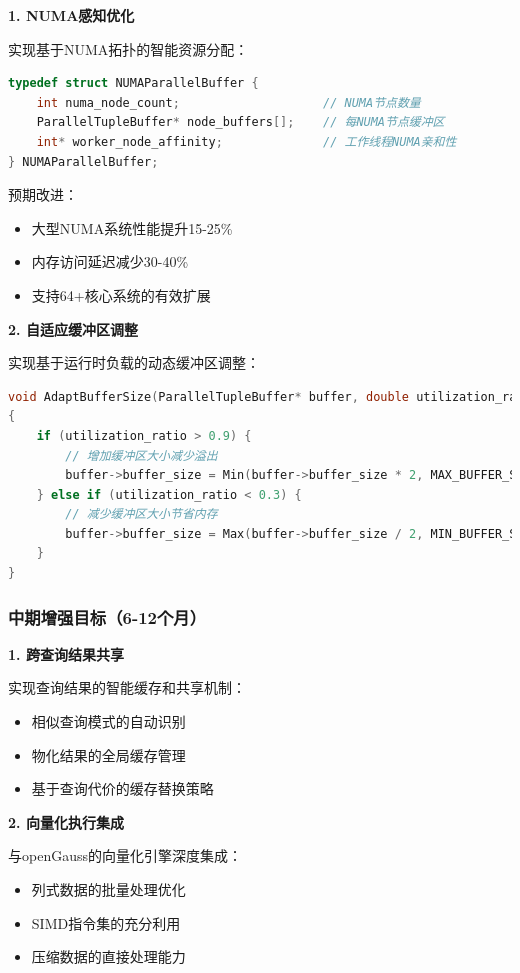 \textbf{1. NUMA感知优化}

实现基于NUMA拓扑的智能资源分配：
\begin{lstlisting}[language=C, caption=NUMA感知缓冲区分配]
typedef struct NUMAParallelBuffer {
    int numa_node_count;                    // NUMA节点数量
    ParallelTupleBuffer* node_buffers[];    // 每NUMA节点缓冲区
    int* worker_node_affinity;              // 工作线程NUMA亲和性
} NUMAParallelBuffer;
\end{lstlisting}

预期改进：
\begin{itemize}
    \item 大型NUMA系统性能提升15-25\%
    \item 内存访问延迟减少30-40\%
    \item 支持64+核心系统的有效扩展
\end{itemize}

\textbf{2. 自适应缓冲区调整}

实现基于运行时负载的动态缓冲区调整：
\begin{lstlisting}[language=C, caption=自适应缓冲区大小调整]
void AdaptBufferSize(ParallelTupleBuffer* buffer, double utilization_ratio)
{
    if (utilization_ratio > 0.9) {
        // 增加缓冲区大小减少溢出
        buffer->buffer_size = Min(buffer->buffer_size * 2, MAX_BUFFER_SIZE);
    } else if (utilization_ratio < 0.3) {
        // 减少缓冲区大小节省内存
        buffer->buffer_size = Max(buffer->buffer_size / 2, MIN_BUFFER_SIZE);
    }
}
\end{lstlisting}

\subsubsection{中期增强目标（6-12个月）}

\textbf{1. 跨查询结果共享}

实现查询结果的智能缓存和共享机制：
\begin{itemize}
    \item 相似查询模式的自动识别
    \item 物化结果的全局缓存管理
    \item 基于查询代价的缓存替换策略
\end{itemize}

\textbf{2. 向量化执行集成}

与openGauss的向量化引擎深度集成：
\begin{itemize}
    \item 列式数据的批量处理优化
    \item SIMD指令集的充分利用
    \item 压缩数据的直接处理能力
\end{itemize}

